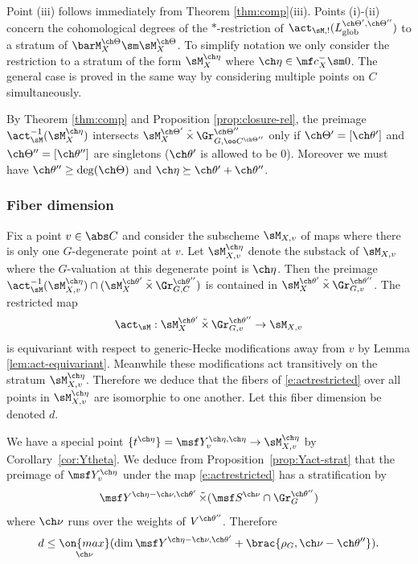 \documentclass[final]{amsart}
\theoremstyle{remark}
\theoremstyle{definition}
\DeclareMathOperator*{\ttimes}{\tilde\times}
\numberwithin{equation}{section}
\begin{document}
Point (iii) follows immediately from Theorem \ref{thm:comp}(iii). 
Points (i)-(ii) concern the cohomological degrees 
of the $*$-restriction of $\act_{\sM,!}(L^{\ch\Theta',\ch\Theta''}_{\mathrm{glob}})$
to a stratum of $\barM^{\ch\Theta}_X \sm \sM_X^{\ch\Theta}$. 
To simplify notation we only consider the restriction
to a stratum of the form $\sM_X^{\ch\eta}$ where $\ch\eta \in \mf c_X^- \sm 0$. 
The general case is proved in the same way by considering multiple points on $C$ 
simultaneously. 

\smallskip

By Theorem \ref{thm:comp} and Proposition \ref{prop:closure-rel}, the preimage 
$\act_\sM^{-1}(\sM_X^{\ch\eta})$ intersects $\sM_X^{\ch\Theta'} \ttimes \Gr^{\ch\Theta''}_{G,\oo C^{\ch\Theta''}}$ only if 
$\ch\Theta' = [\ch\theta']$ and $\ch\Theta'' = [\ch\theta'']$ are singletons 
($\ch\theta'$ is allowed to be $0$). 
Moreover we must have $\ch\theta'' \ge \deg(\ch\Theta)$ and $\ch\eta \succeq \ch\theta' + \ch\theta''$. 

\subsubsection{Fiber dimension}
Fix a point $v \in \abs C$ and consider the subscheme $\sM_{X,v}$
of maps where there is only one $G$-degenerate point at $v$. 
Let $\sM_{X,v}^{\ch\eta}$ denote the substack of $\sM_{X,v}$ where the $G$-valuation at
this degenerate point is $\ch\eta$.
Then the preimage $\act_\sM^{-1}(\sM_{X,v}^{\ch\eta}) \cap (\sM_X^{\ch\theta'} \ttimes \Gr^{\ch\theta''}_{G,C})$ is contained in $\sM_X^{\ch\theta'} \ttimes \Gr^{\ch\theta''}_{G,v}$.
The restricted map 
\begin{equation} \label{e:actrestricted}
 \act_\sM : \sM_X^{\ch\theta'} \ttimes \Gr^{\ch\theta''}_{G,v} \to \sM_{X,v} 
\end{equation}
is equivariant with respect to generic-Hecke modifications away from $v$ by Lemma \ref{lem:act-equivariant}. Meanwhile these modifications act transitively on the stratum 
$\sM_{X,v}^{\ch\eta}$. 
Therefore we deduce that the fibers of \eqref{e:actrestricted} over 
all points in $\sM_{X,v}^{\ch\eta}$  are isomorphic to one another. 
Let this fiber dimension be denoted $d$. 

We have a special point $\{ t^{\ch\eta} \} = \msf Y^{\ch\eta,\ch\eta}_v \to \sM^{\ch\eta}_{X,v}$
by Corollary~\ref{cor:Ytheta}. 
We deduce from Proposition~\ref{prop:Yact-strat} that 
the preimage of $\msf Y^{\ch\eta}_v$ under the map \eqref{e:actrestricted} has a 
stratification by 
\[ \msf Y^{\ch\eta - \ch\nu, \ch\theta'} \ttimes (\msf S^{\ch\nu} \cap \Gr^{\ch\theta''}_G) \]
where $\ch\nu$ runs over the weights of $V^{\ch\theta''}$.
Therefore
\begin{equation} \label{e:actfiberdim}
d \le \underset{\ch\nu}{\on{max}} (\dim \msf Y^{\ch\eta-\ch\nu,\ch\theta'} + \brac{\rho_G,\ch\nu-\ch\theta''}). 
\end{equation}
\end{document}
